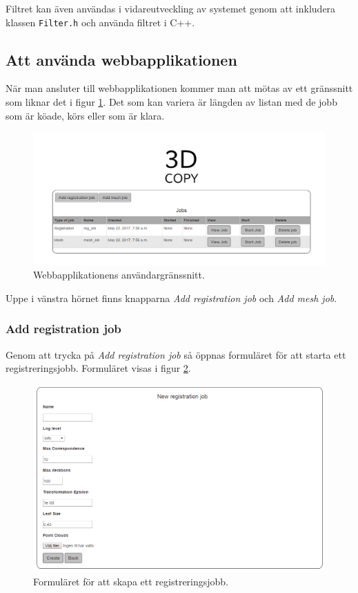 \documentclass[a4paper,titlepage,12pt]{article}
\begin{document}
	Filtret kan även användas i vidareutveckling av systemet genom att inkludera klassen \texttt{Filter.h} och använda filtret i C++.
	
	\subsection{Att använda webbapplikationen}
	
	När man ansluter till webbapplikationen kommer man att mötas av ett gränssnitt som liknar det i figur \ref{fig:web_gui}. Det som kan variera är längden av listan med de jobb som är köade, körs eller som är klara.
	
	\begin{figure}[H]
		\centering
		\includegraphics[width=160mm]{images/gui_web.PNG}
		\caption{Webbapplikationens användargränssnitt.}
		\label{fig:web_gui}
	\end{figure}

	Uppe i vänstra hörnet finns knapparna \textit{Add registration job} och \textit{Add mesh job}.
	
	\subsubsection{Add registration job}
	
	Genom att trycka på \textit{Add registration job} så öppnas formuläret för att starta ett registreringsjobb. Formuläret visas i figur \ref{fig:reg_job_form}.
	
	\begin{figure}[H]
		\centering
		\includegraphics[width=160mm]{images/reg_job_form.PNG}
		\caption{Formuläret för att skapa ett registreringsjobb.}
		\label{fig:reg_job_form}
	\end{figure}
\end{document}
